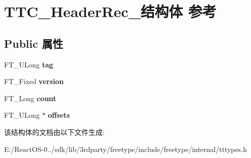 \hypertarget{struct_t_t_c___header_rec__}{}\section{T\+T\+C\+\_\+\+Header\+Rec\+\_\+结构体 参考}
\label{struct_t_t_c___header_rec__}
\subsection*{Public 属性}
\begin{DoxyCompactItemize}
\item 
\mbox{\label{struct_t_t_c___header_rec___a7fc09906e402f8937b6ca207c84453b4}} 
F\+T\+\_\+\+U\+Long {\bfseries tag}
\item 
\mbox{\label{struct_t_t_c___header_rec___aa9ecb33279c68c3c00c1232441da5801}} 
F\+T\+\_\+\+Fixed {\bfseries version}
\item 
\mbox{\label{struct_t_t_c___header_rec___a0bf5898e9d8c55bc74f51712a5ad1b58}} 
F\+T\+\_\+\+Long {\bfseries count}
\item 
\mbox{\label{struct_t_t_c___header_rec___a2ab33f787e8085d7086968fb931060b5}} 
F\+T\+\_\+\+U\+Long $\ast$ {\bfseries offsets}
\end{DoxyCompactItemize}


该结构体的文档由以下文件生成\+:\begin{DoxyCompactItemize}
\item 
E\+:/\+React\+O\+S-\/0../sdk/lib/3rdparty/freetype/include/freetype/internal/tttypes.\+h\end{DoxyCompactItemize}

